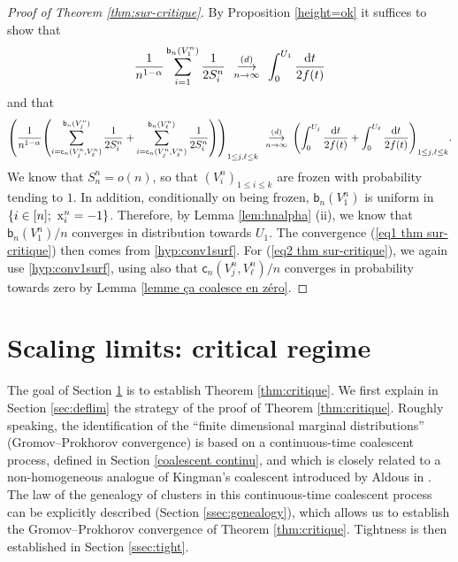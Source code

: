 \documentclass[11pt]{article}
\theoremstyle{plain}
\theoremstyle{definition}
\theoremstyle{remark}
\newcommand{\1}{\mathbbm{1}} %
\newcommand{\birth}{\mathsf{b}} %
\newcommand{\coal}{\mathsf{c}} %
\newcommand{\X}{\mathrm x} %
\newcommand{\cvloi}[1][n]{\enskip\mathop{\longrightarrow}^{(d)}_{#1 \to \infty}\enskip}
\let\originalleft\left
\let\originalright\right
\renewcommand{\left}{\mathopen{}\mathclose\bgroup\originalleft}
\renewcommand{\right}{\aftergroup\egroup\originalright}
\begin{document}
\begin{proof}[Proof of Theorem \ref{thm:sur-critique}]
By Proposition \ref{height=ok} it suffices to show that
\begin{equation}\label{eq1 thm sur-critique}
\frac{1}{n^{1-\alpha}}\sum_{i=1}^{\birth_n(V_1^n)} \frac{1}{2S^n_i} 
\cvloi[n] 
\int_{0}^{U_1} \frac{\mathrm{d}t}{2f(t)}
\end{equation}
and that
\begin{equation}\label{eq2 thm sur-critique}
\left(\frac{1}{n^{1-\alpha}}\left(\sum_{i=\coal_n(V^n_j,V^n_\ell)}^{\birth_n(V^n_j)} \frac{1}{2S^n_i} 
+\sum_{i=\coal_n(V^n_j,V^n_\ell)}^{\birth_n(V^n_\ell)} \frac{1}{2S^n_i}
\right)\right)_{1\le j,\ell\le k} \cvloi[n] \left(\int_0^{U_j } \frac{\mathrm{d}t}{2f(t)}+\int_0^{U_\ell } \frac{\mathrm{d}t}{2f(t)}\right)_{1\le j,\ell\le k}.
\end{equation}
We know that $S^n_n=o(n)${, so that $(V^{n}_{i})_{1 \leq i \leq k}$ are frozen with probability tending to $1$. In addition,} conditionally on being frozen, $\birth_n(V^n_1)$ is uniform in $\left\{i \in [n]; \ \X^n_i=-1\right\}$. Therefore, by Lemma \ref{lem:hnalpha} (ii), we know that $\birth_n(V^n_1)/n$ converges in distribution towards $U_1$.
The convergence (\ref{eq1 thm sur-critique}) then comes from \ref{hyp:conv1surf}. For (\ref{eq2 thm sur-critique}), we again use \ref{hyp:conv1surf}, using also that $\coal_n(V^n_j,V^n_\ell)/n$ converges in probability towards zero by Lemma \ref{lemme ça coalesce en zéro}.
\end{proof}



\section{Scaling limits: critical regime}
\label{sec:critical}


The goal of Section \ref{sec:critical} is to establish Theorem \ref{thm:critique}. We first explain in Section \ref{sec:deflim} the strategy of the proof of Theorem \ref{thm:critique}.  Roughly speaking, the identification of the ``finite dimensional marginal distributions'' (Gromov--Prokhorov convergence) is based on a continuous-time coalescent process,  defined in Section \ref{coalescent continu}, and which is closely related to a non-homogeneous analogue of Kingman's coalescent introduced by Aldous in \cite{A98} . The law of the genealogy of clusters in this continuous-time coalescent process can be explicitly described (Section \ref{ssec:genealogy}), which allows us to establish the Gromov--Prokhorov convergence of Theorem \ref{thm:critique}. Tightness is then established in  Section \ref{ssec:tight}.
\end{document}
